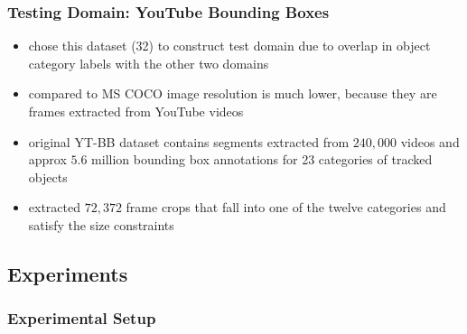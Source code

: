 \subsubsection{Testing Domain: YouTube Bounding Boxes}
\begin{itemize}
	\item chose this dataset (32) to construct test domain due to overlap in object category labels with the other two domains
	\item compared to MS COCO image resolution is much lower, because they are frames extracted from YouTube videos
	\item original YT-BB dataset contains segments extracted from $240,000$ videos and approx $5.6$ million bounding box annotations for 23 categories of tracked objects
	\item extracted $72,372$ frame crops that fall into one of the twelve categories and satisfy the size constraints
\end{itemize}

\subsection{Experiments}
\subsubsection{Experimental Setup}

